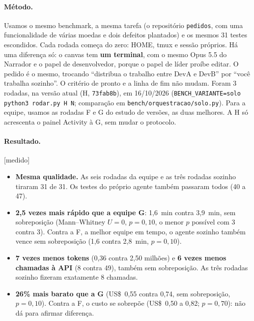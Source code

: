 \documentclass[11pt,a4paper]{article}
\newcommand{\rot}[1]{\textsf{\footnotesize[#1]}}
\begin{document}
\paragraph{Método.} Usamos o mesmo benchmark, a mesma tarefa (o repositório \texttt{pedidos}, com uma
funcionalidade de várias moedas e dois defeitos plantados) e os mesmos 31 testes escondidos. Cada
rodada começa do zero: HOME, tmux e sessão próprios. Há uma diferença só: o canvas tem \textbf{um
terminal}, com o mesmo Opus 5.5 do Narrador e o papel de desenvolvedor, porque o papel de líder proíbe
editar. O pedido é o mesmo, trocando ``distribua o trabalho entre DevA e DevB'' por ``você trabalha
sozinho''. O critério de pronto e a linha de fim não mudam. Foram 3 rodadas, na versão atual (H,
\texttt{73fab8b}), em 16/10/2026 (\texttt{BENCH\_VARIANTE=solo python3 rodar.py H N}; comparação em
\texttt{bench/orquestracao/solo.py}). Para a equipe, usamos as rodadas F e G do estudo de versões, as
duas melhores. A H só acrescenta o painel Activity à G, sem mudar o protocolo.

\begin{table}[H]
\centering\small
\caption{Um terminal sozinho contra a equipe de três agentes, na mesma tarefa \rot{medido}. Média e,
entre parênteses, o mínimo e o máximo das 3 rodadas. A equipe F tem o mesmo protocolo de leitura do
transcript da G, sem o ajuste de pedidos em lote.}

\end{table}

\paragraph{Resultado.} \rot{medido}
\begin{itemize}
  \item \textbf{Mesma qualidade.} As seis rodadas da equipe e as três rodadas sozinho tiraram 31 de 31.
    Os testes do próprio agente também passaram todos (40 a 47).
  \item \textbf{2,5 vezes mais rápido que a equipe G}: 1,6~min contra 3,9~min, sem sobreposição
    (Mann--Whitney $U = 0$, $p = 0{,}10$, o menor $p$ possível com 3 contra 3). Contra a F, a melhor
    equipe em tempo, o agente sozinho também vence sem sobreposição (1,6 contra 2,8~min, $p = 0{,}10$).
  \item \textbf{7 vezes menos tokens} (0,36 contra 2,50 milhões) e \textbf{6 vezes menos chamadas à
    API} (8 contra 49), também sem sobreposição. As três rodadas sozinho fizeram exatamente 8 chamadas.
  \item \textbf{26\% mais barato que a G} (US\$~0,55 contra 0,74, sem sobreposição, $p = 0{,}10$).
    Contra a F, o custo se sobrepõe (US\$~0,50 a 0,82; $p = 0{,}70$): não dá para afirmar diferença.
\end{itemize}
\end{document}

